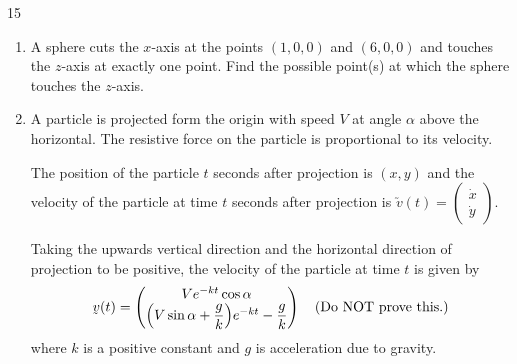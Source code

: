 \documentclass[12pt]{extarticle}
\begin{document}
\begin{shortanswer}
\begin{bookletquestion}{15}
\begin{enumerate}
			\item {} A sphere cuts the $x$-axis at the points $(1,0,0)$ and $(6,0,0)$ and touches the $z$-axis at exactly one point.
			      Find the possible point(s) at which the sphere touches the $z$-axis.

			\item {} A particle is projected form the origin with speed $V$ at angle $\alpha$ above the horizontal.
			      The resistive force on the particle is proportional to its velocity.

			      The position of the particle $t$ seconds after projection is $(x,y)$ and the velocity of the particle at time $t$ seconds after projection is $\utilde{v}(t)=\begin{pmatrix}\dot{x}\\\dot{y}\end{pmatrix}$.

			      Taking the upwards vertical direction and the horizontal direction of projection to be positive, the velocity of the particle at time $t$ is given by
			      \[\utilde{v}(t)=\begin{pmatrix}Ve^{-kt}\cos\alpha\\\qty(V\sin\alpha+\dfrac{g}{k})e^{-kt}-\dfrac{g}{k}\end{pmatrix}\quad\text{(Do NOT prove this.)}\]
			      where $k$ is a positive constant and $g$ is acceleration due to gravity.


\end{enumerate}
\end{bookletquestion}
\end{shortanswer}
\end{document}
